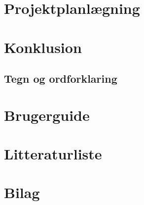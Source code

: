\documentclass[12pt,oneside,a4paper,english]{article}
\begin{document}
\newpage
\section{Projektplanlægning}

\thispagestyle{fancy}



\newpage
\section{Konklusion}

\thispagestyle{fancy}

\newpage
\begin{flushleft}
\section{Tegn og ordforklaring}
\end{flushleft}

\thispagestyle{fancy}

\newpage
\section{Brugerguide}

\thispagestyle{fancy}

\newpage
\section{Litteraturliste}

\newpage
\section{Bilag}

\end{document}
